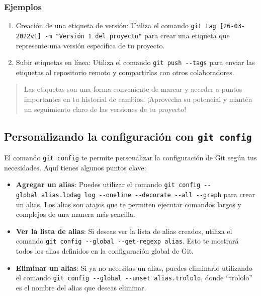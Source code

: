 \documentclass[
  letterpaper,
  DIV=11,
  numbers=noendperiod]{scrartcl}
\begin{document}
\hypertarget{ejemplos}{%
\subsubsection{Ejemplos}\label{ejemplos}}

\begin{enumerate}
\def\labelenumi{\arabic{enumi}.}
\item
  Creación de una etiqueta de versión: Utiliza el comando
  \texttt{git\ tag\ {[}26-03-2022v1{]}\ -m\ "Versión\ 1\ del\ proyecto"}
  para crear una etiqueta que represente una versión específica de tu
  proyecto.
\item
  Subir etiquetas en línea: Utiliza el comando
  \texttt{git\ push\ -\/-tags} para enviar las etiquetas al repositorio
  remoto y compartirlas con otros colaboradores.
\end{enumerate}

\begin{quote}
Las etiquetas son una forma conveniente de marcar y acceder a puntos
importantes en tu historial de cambios. ¡Aprovecha su potencial y mantén
un seguimiento claro de las versiones de tu proyecto!
\end{quote}

\hypertarget{personalizando-la-configuraciuxf3n-con-git-config}{%
\subsection{\texorpdfstring{Personalizando la configuración con
\texttt{git\ config}}{Personalizando la configuración con git config}}\label{personalizando-la-configuraciuxf3n-con-git-config}}

El comando \texttt{git\ config} te permite personalizar la configuración
de Git según tus necesidades. Aquí tienes algunos puntos clave:

\begin{itemize}
\item
  \textbf{Agregar un alias}: Puedes utilizar el comando
  \texttt{git\ config\ -\/-global\ alias.lodag\ \textquotesingle{}log\ -\/-oneline\ -\/-decorate\ -\/-all\ -\/-graph\textquotesingle{}}
  para crear un alias. Los alias son atajos que te permiten ejecutar
  comandos largos y complejos de una manera más sencilla.
\item
  \textbf{Ver la lista de alias}: Si deseas ver la lista de alias
  creados, utiliza el comando
  \texttt{git\ config\ -\/-global\ -\/-get-regexp\ alias}. Esto te
  mostrará todos los alias definidos en la configuración global de Git.
\item
  \textbf{Eliminar un alias}: Si ya no necesitas un alias, puedes
  eliminarlo utilizando el comando
  \texttt{git\ config\ -\/-global\ -\/-unset\ alias.trololo}, donde
  ``trololo'' es el nombre del alias que deseas eliminar.
\end{itemize}
\end{document}
